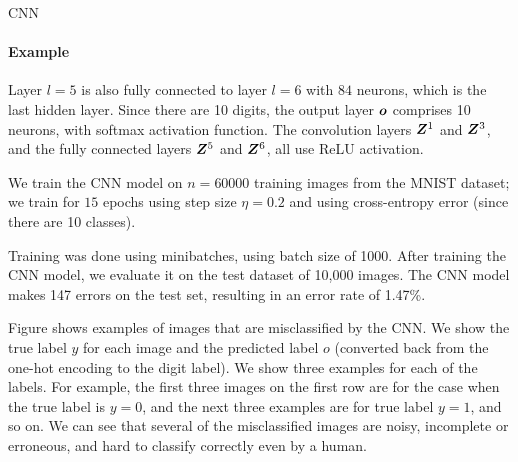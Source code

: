 \begin{frame}{CNN}
\framesubtitle{Example}

Layer $l=5$ is
    also fully connected to layer $l=6$ with $84$ neurons, which is the
    last hidden layer. Since there are 10 digits, the output layer ${\boldsymbol o}$
    comprises 10 neurons, with softmax activation function. The
    convolution layers ${\boldsymbol Z}^1$ and
    ${\boldsymbol Z}^3$, and the fully connected layers ${\boldsymbol Z}^5$ and ${\boldsymbol Z}^6$, all use
    ReLU activation.


\medskip


    We train the CNN model on $n=60000$ training images from the
    MNIST dataset; we train for $15$ epochs using step size
    $\eta=0.2$ and using cross-entropy error (since there are 10
    classes). 


\medskip

    Training was done using minibatches, using batch size of 1000.    
    After training the CNN model, we evaluate 
    it on the test  dataset of 10,000 images. 
    The CNN model makes 147 errors on the
    test set, resulting in an error rate of 1.47\%.


\medskip

Figure shows examples of images that
    are misclassified by the CNN. We show the true label $y$ for each
    image and the predicted label $o$ (converted back from the one-hot
    encoding to the digit label). We show three examples for each
    of the labels. For example, the first three images on the first row
    are for the case when the true label is $y=0$, and the next three
    examples are for true label $y=1$, and so on. We can see that
    several of the misclassified images are noisy, 
    incomplete or erroneous, and hard to classify correctly even by
    a human.
\end{frame}

